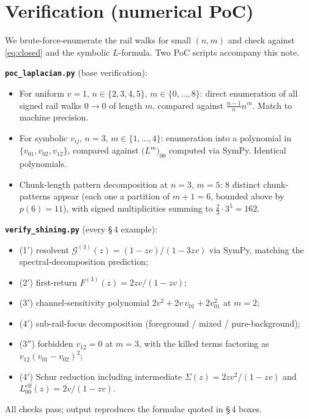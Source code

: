 \documentclass[11pt,a4paper]{article}
\begin{document}
\section{Verification (numerical PoC)}

We brute-force-enumerate the rail walks for small $(n,m)$ and check against
\eqref{eq:closed} and the symbolic $L$-formula. Two PoC scripts accompany
this note.

\smallskip
\textbf{\texttt{poc\_laplacian.py}} (base verification):
\begin{itemize}[leftmargin=2em,itemsep=2pt]
  \item For uniform $v=1$, $n\in\{2,3,4,5\}$, $m\in\{0,\dots,8\}$: direct
        enumeration of all signed rail walks $0\to 0$ of length $m$,
        compared against $\frac{n-1}{n}n^{m}$. Match to machine precision.
  \item For symbolic $v_{ij}$, $n=3$, $m\in\{1,\dots,4\}$: enumeration into
        a polynomial in $\{v_{01},v_{02},v_{12}\}$, compared against
        $\big(L^m\big)_{00}$ computed via SymPy. Identical polynomials.
  \item Chunk-length pattern decomposition at $n{=}3$, $m{=}5$:
        $8$ distinct chunk-patterns appear (each one a partition of
        $m{+}1{=}6$, bounded above by $p(6){=}11$), with signed
        multiplicities summing to $\frac{2}{3}\!\cdot\!3^{5}{=}162$.
\end{itemize}

\smallskip
\textbf{\texttt{verify\_shining.py}} (every \S\,4 example):
\begin{itemize}[leftmargin=2em,itemsep=2pt]
  \item (1$'$) resolvent $\mathcal G^{(3)}(z) = (1-zv)/(1-3zv)$ via
        SymPy, matching the spectral-decomposition prediction;
  \item (2$'$) first-return $F^{(3)}(z) = 2zv/(1-zv)$;
  \item (3$'$) channel-sensitivity polynomial
        $2v^{2}+2v\,v_{01}+2v_{01}^{2}$ at $m{=}2$;
  \item (4$'$) sub-rail-focus decomposition
        (foreground / mixed / pure-background);
  \item (3$''$) forbidden $v_{12}{=}0$ at $m{=}3$, with the killed
        terms factoring as $v_{12}(v_{01}-v_{02})^{2}$;
  \item (4$'$) Schur reduction including intermediate
        $\Sigma(z)=2zv^{2}/(1-zv)$ and
        $L^{\text{eff}}_{00}(z)=2v/(1-zv)$.
\end{itemize}
All checks pass; output reproduces the formulae quoted in \S\,4 boxes.
\end{document}
